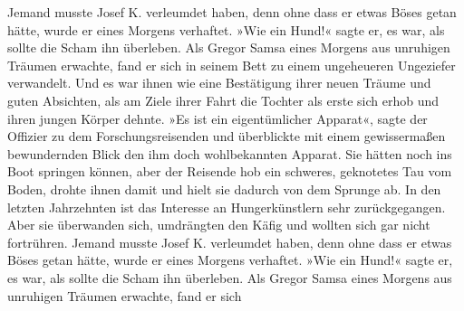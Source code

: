 \documentclass[12pt]{g-brief}
\begin{document}
\begin{g-brief}
Jemand musste Josef K. verleumdet haben, denn ohne dass er etwas Böses getan
hätte, wurde er eines Morgens verhaftet. »Wie ein Hund!« sagte er, es war,
als sollte die Scham ihn überleben. Als Gregor Samsa eines Morgens aus
unruhigen Träumen erwachte, fand er sich in seinem Bett zu einem ungeheueren
Ungeziefer verwandelt. Und es war ihnen wie eine Bestätigung ihrer neuen Träume
und guten Absichten, als am Ziele ihrer Fahrt die Tochter als erste sich erhob und
ihren jungen Körper dehnte. »Es ist ein eigentümlicher Apparat«, sagte der Offizier
zu dem Forschungsreisenden und überblickte mit einem gewissermaßen bewundernden
Blick den ihm doch wohlbekannten Apparat. Sie hätten noch ins Boot springen
können, aber der Reisende hob ein schweres, geknotetes Tau vom Boden, drohte ihnen
damit und hielt sie dadurch von dem Sprunge ab. In den letzten Jahrzehnten
ist das Interesse an Hungerkünstlern sehr zurückgegangen.
Aber sie überwanden sich, umdrängten den Käfig und wollten sich gar nicht fortrühren.
Jemand musste Josef K. verleumdet haben, denn ohne dass er etwas Böses getan hätte,
wurde er eines Morgens verhaftet. »Wie ein Hund!« sagte er, es war,
als sollte die Scham ihn überleben.
Als Gregor Samsa eines Morgens aus unruhigen Träumen erwachte, fand er sich
\end{g-brief}
\end{document}

